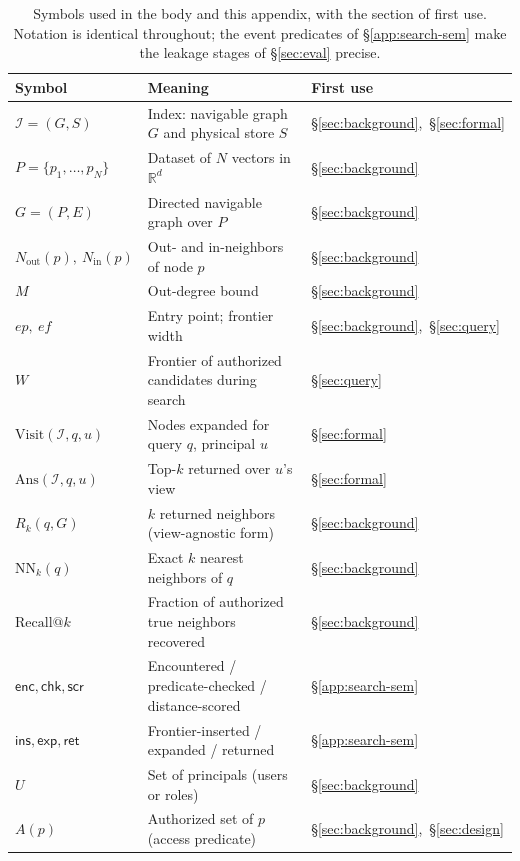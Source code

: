 \documentclass[sigconf, nonacm, review]{acmart}
\newcommand{\Nout}{N_{\mathrm{out}}}
\newcommand{\Nin}{N_{\mathrm{in}}}
\begin{document}
\begin{table}[t]
\centering
\caption{Symbols used in the body and this appendix, with the section of first
use. Notation is identical throughout; the event predicates of
\S\ref{app:search-sem} make the leakage stages of \S\ref{sec:eval} precise.}
\label{tab:symbols}
\small
\renewcommand{\arraystretch}{1.18}
\begin{tabular}{@{}l l l@{}}
\toprule
Symbol & Meaning & First use \\
\midrule
$\mathcal{I}=(G,S)$ & Index: navigable graph $G$ and physical store $S$ & \S\ref{sec:background},~\S\ref{sec:formal} \\
$P=\{p_1,\dots,p_N\}$ & Dataset of $N$ vectors in $\mathbb{R}^d$ & \S\ref{sec:background} \\
$G=(P,E)$ & Directed navigable graph over $P$ & \S\ref{sec:background} \\
$\Nout(p),\ \Nin(p)$ & Out- and in-neighbors of node $p$ & \S\ref{sec:background} \\
$M$ & Out-degree bound & \S\ref{sec:background} \\
$\mathit{ep},\ \mathit{ef}$ & Entry point; frontier width & \S\ref{sec:background},~\S\ref{sec:query} \\
$W$ & Frontier of authorized candidates during search & \S\ref{sec:query} \\
$\mathrm{Visit}(\mathcal{I},q,u)$ & Nodes expanded for query $q$, principal $u$ & \S\ref{sec:formal} \\
$\mathrm{Ans}(\mathcal{I},q,u)$ & Top-$k$ returned over $u$'s view & \S\ref{sec:formal} \\
$R_k(q,G)$ & $k$ returned neighbors (view-agnostic form) & \S\ref{sec:background} \\
$\mathrm{NN}_k(q)$ & Exact $k$ nearest neighbors of $q$ & \S\ref{sec:background} \\
$\mathrm{Recall}@k$ & Fraction of authorized true neighbors recovered & \S\ref{sec:background} \\
$\mathsf{enc},\mathsf{chk},\mathsf{scr}$ & Encountered / predicate-checked / distance-scored & \S\ref{app:search-sem} \\
$\mathsf{ins},\mathsf{exp},\mathsf{ret}$ & Frontier-inserted / expanded / returned & \S\ref{app:search-sem} \\
$U$ & Set of principals (users or roles) & \S\ref{sec:background} \\
$A(p)$ & Authorized set of $p$ (access predicate) & \S\ref{sec:background},~\S\ref{sec:design} \\

\end{tabular}
\end{table}
\end{document}
